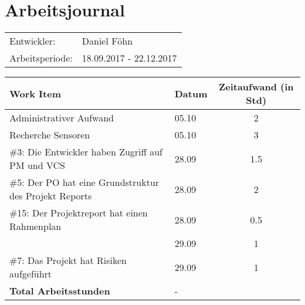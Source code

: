 \documentclass[a4paper, 10pt, fleqn]{article}
\newcommand{\header}{\textbf{Work Item}&\textbf{Datum}&\textbf{Zeitaufwand (in Std)}\\\toprule}
\newcommand{\footer}{\midrule\textbf{Total Arbeitsstunden}&-&\textbf{ }\\\midrule\bottomrule}
\begin{document}
	\section*{Arbeitsjournal}
    \begin{tabular}{ll}
        Entwickler: & Daniel Föhn \\
        Arbeitsperiode: & 18.09.2017 - 22.12.2017\\
    \end{tabular}

	\begin{table}[H]
		\centering
		\begin{tabular}{p{9cm}|p{3cm}|c}
            \header

            Administrativer Aufwand & 05.10 & 2\\
            
            Recherche Sensoren & 05.10 & 3\\
            \#3: Die Entwickler haben Zugriff auf PM und VCS& 28.09 & 1.5\\
            \#5: Der PO hat eine Grundstruktur des Projekt Reports& 28.09 & 2\\
            \#15: Der Projektreport hat einen Rahmenplan & 28.09 & 0.5\\
            & 29.09 & 1\\
            \#7: Das Projekt hat Risiken aufgeführt & 29.09 & 1\\
            
            \footer
		\end{tabular}
	\end{table}
\end{document}
